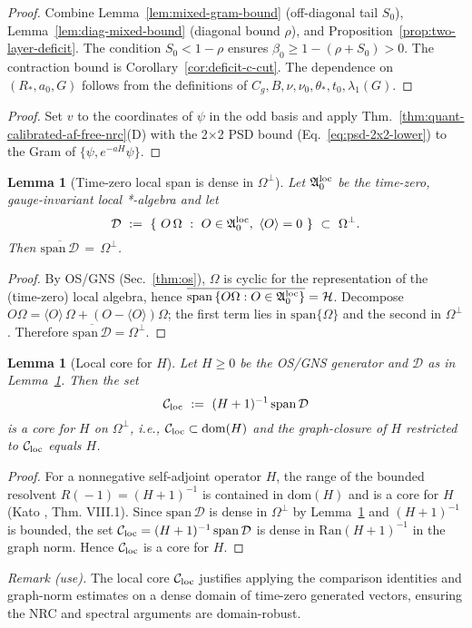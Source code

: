 \documentclass[11pt]{amsart}
\theoremstyle{plain}
\newtheorem{lemma}[theorem]{Lemma}
\theoremstyle{definition}
\theoremstyle{remark}
\begin{document}
\begin{proof}
Combine Lemma~\ref{lem:mixed-gram-bound} (off-diagonal tail $S_0$), Lemma~\ref{lem:diag-mixed-bound} (diagonal bound $\rho$), and Proposition~\ref{prop:two-layer-deficit}. The condition $S_0<1-\rho$ ensures $\beta_0\ge 1-(\rho+S_0)>0$. The contraction bound is Corollary~\ref{cor:deficit-c-cut}. The dependence on $(R_*,a_0,G)$ follows from the definitions of $C_g,B,\nu,\nu_0,\theta_*,t_0,\lambda_1(G)$.
\end{proof}
\begin{proof}
Set $v$ to the coordinates of $\psi$ in the odd basis and apply Thm.~\ref{thm:quant-calibrated-af-free-nrc}(D) with the 2$\times$2 PSD bound (Eq.~\eqref{eq:psd-2x2-lower}) to the Gram of $\{\psi,e^{-aH}\psi\}$.
\end{proof}

\medskip
\begin{lemma}[Time-zero local span is dense in $\Omega^{\perp}$]\label{lem:local-span-dense}
Let $\mathfrak{A}_0^{\rm loc}$ be the time-zero, gauge-invariant local *-algebra and let
\[
  \mathcal D\ :=\ \{\ O\,\Omega\ :\ O\in \mathfrak{A}_0^{\rm loc},\ \langle O\rangle=0\ \}\ \subset\ \Omega^{\perp}.
\]
Then $\overline{\mathrm{span}\,\mathcal D}\,=\,\Omega^{\perp}$.
\end{lemma}

\begin{proof}
By OS/GNS (Sec.~\ref{thm:os}), $\Omega$ is cyclic for the representation of the (time-zero) local algebra, hence $\overline{\mathrm{span}\,\{O\Omega: O\in \mathfrak{A}_0^{\rm loc}\}}=\mathcal H$. Decompose $O\Omega=\langle O\rangle\,\Omega+(O-\langle O\rangle)\Omega$; the first term lies in $\mathrm{span}\{\Omega\}$ and the second in $\Omega^{\perp}$. Therefore $\overline{\mathrm{span}\,\mathcal D}=\Omega^{\perp}$.
\end{proof}

\begin{lemma}[Local core for $H$]\label{lem:local-core}
Let $H\ge 0$ be the OS/GNS generator and $\mathcal D$ as in Lemma~\ref{lem:local-span-dense}. Then the set
\[
  \mathcal C_{\rm loc}\ :=\ (H+1)^{-1}\,\mathrm{span}\,\mathcal D
\]
is a core for $H$ on $\Omega^{\perp}$, i.e., $\mathcal C_{\rm loc}\subset\mathrm{dom}(H)$ and the graph-closure of $H$ restricted to $\mathcal C_{\rm loc}$ equals $H$.
\end{lemma}

\begin{proof}
For a nonnegative self-adjoint operator $H$, the range of the bounded resolvent $R(\!-1\!)=(H+1)^{-1}$ is contained in $\mathrm{dom}(H)$ and is a core for $H$ (Kato \cite{Kato1995}, Thm. VIII.1). Since $\mathrm{span}\,\mathcal D$ is dense in $\Omega^{\perp}$ by Lemma~\ref{lem:local-span-dense} and $(H+1)^{-1}$ is bounded, the set $\mathcal C_{\rm loc}=(H+1)^{-1}\,\mathrm{span}\,\mathcal D$ is dense in $\mathrm{Ran}(H+1)^{-1}$ in the graph norm. Hence $\mathcal C_{\rm loc}$ is a core for $H$.
\end{proof}
\noindent\emph{Remark (use).} The local core $\mathcal C_{\rm loc}$ justifies applying the comparison identities and graph-norm estimates on a dense domain of time-zero generated vectors, ensuring the NRC and spectral arguments are domain-robust.
\end{document}
